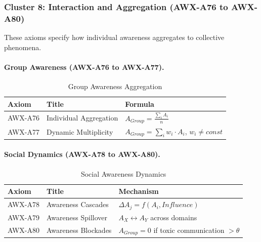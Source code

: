 \subsubsection{Cluster 8: Interaction and Aggregation (AWX-A76 to AWX-A80)}

These axioms specify how individual awareness aggregates to collective phenomena.

\paragraph{Group Awareness (AWX-A76 to AWX-A77).}

\begin{table}[htbp]
\centering
\caption{Group Awareness Aggregation}
\label{tab:group-awareness}
\renewcommand{\arraystretch}{1.3}
\begin{tabular}{@{}llp{5.5cm}@{}}
\toprule
\textbf{Axiom} & \textbf{Title} & \textbf{Formula} \\
\midrule
AWX-A76 & Individual Aggregation & $A_{Group} = \frac{\sum_i A_i}{n}$ \\
AWX-A77 & Dynamic Multiplicity & $A_{Group} = \sum_i w_i \cdot A_i$, $w_i \neq const$ \\
\bottomrule
\end{tabular}
\end{table}

\paragraph{Social Dynamics (AWX-A78 to AWX-A80).}

\begin{table}[htbp]
\centering
\caption{Social Awareness Dynamics}
\label{tab:social-dynamics}
\renewcommand{\arraystretch}{1.3}
\begin{tabular}{@{}llp{5.5cm}@{}}
\toprule
\textbf{Axiom} & \textbf{Title} & \textbf{Mechanism} \\
\midrule
AWX-A78 & Awareness Cascades & $\Delta A_j = f(A_i, Influence)$ \\
AWX-A79 & Awareness Spillover & $A_X \leftrightarrow A_Y$ across domains \\
AWX-A80 & Awareness Blockades & $A_{Group} = 0$ if toxic communication $> \theta$ \\
\bottomrule
\end{tabular}
\end{table}

